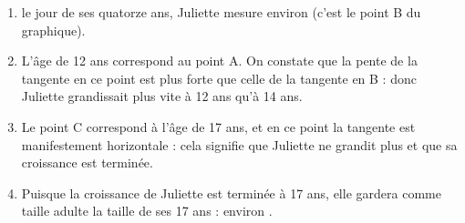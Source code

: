 \begin{enumerate}
	\item le jour de ses quatorze ans, Juliette mesure environ  (c'est le point B du graphique).

	\item L'âge de 12 ans correspond au point A. On constate que la pente de la tangente en ce point est plus forte que celle de la tangente en B : donc Juliette grandissait plus vite à 12 ans qu'à 14 ans.

	\item Le point C correspond à l'âge de 17 ans, et en ce point la tangente est manifestement horizontale : cela signifie que Juliette ne grandit plus et que sa croissance est terminée.

	\item Puisque la croissance de Juliette est terminée à 17 ans, elle gardera comme taille adulte la taille de ses 17 ans : environ .
\end{enumerate}
